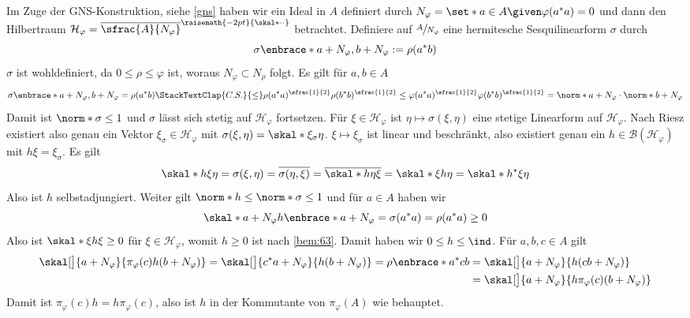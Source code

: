 \begin{beweis}
	Im Zuge der GNS-Konstruktion, siehe \autoref{gns} haben wir ein Ideal in $A$ definiert durch $N_\varphi = \set*{a \in A \given \varphi(a^*a)=0}$ und dann den Hilbertraum $\mathcal{H}_\varphi = \overline{\sfrac{A}{N_\varphi}}^{\raisemath{-2pt}{\skal*{\cdot}{\cdot}}}$ betrachtet.
	Definiere auf $\sfrac{A}{N_\varphi}$ eine hermitesche Sesquilinearform $\sigma$ durch 
	\[
		\sigma \enbrace*{a + N_\varphi, b+ N_\varphi} := \rho(a^* b)
	\]
	$\sigma$ ist wohldefiniert, da $0 \le \rho \le \varphi$ ist, woraus $N_\varphi \subset N_\rho$ folgt.
	Es gilt für $a,b \in A$
	\[
		\sigma \enbrace*{a+ N_\varphi, b+N_\varphi} = \rho(a^*b) \StackTextClap{C.S.}{\le} \rho(a^*a)^{\sfrac{1}{2}} \rho(b^*b)^{\sfrac{1}{2}} \le \varphi(a^*a)^{\sfrac{1}{2}} \varphi(b^*b)^{\sfrac{1}{2}} 
		= \norm*{a + N_\varphi} \cdot \norm*{b+ N_\varphi}
	\]
	Damit ist $\norm*{\sigma}\le 1$ und $\sigma$ lässt sich stetig auf $\mathcal{H}_\varphi$ fortsetzen.
	Für $\xi \in \mathcal{H}_\varphi$ ist $\eta \mapsto \sigma(\xi,\eta)$ eine stetige Linearform auf $\mathcal{H}_\varphi$.
	Nach Riesz existiert also genau ein Vektor $\xi_\sigma \in \mathcal{H}_\varphi$ mit $\sigma(\xi,\eta) = \skal*{\xi_\sigma}{\eta}$.
	$\xi \mapsto \xi_\sigma$ ist linear und beschränkt, also existiert genau ein $h \in \mathcal{B}(\mathcal{H}_\varphi)$ mit $h \xi= \xi_\sigma$.
	Es gilt
	\[
		\skal*{h \xi}{\eta} = \sigma(\xi,\eta) = \overline{\sigma(\eta,\xi)} = \overline{\skal*{h \eta}{\xi}} = \skal*{\xi}{h \eta} = \skal*{h^* \xi}{\eta}
	\]
	Also ist $h$ selbstadjungiert.
	Weiter gilt $\norm*{h} \le \norm*{\sigma} \le 1$ und für $a \in A$ haben wir
	\[
		\skal*{a + N_\varphi}{h \enbrace*{a+ N_\varphi}}= \sigma(a^*a)=\rho(a^*a)\ge 0
	\]
	Also ist $\skal*{\xi}{h \xi} \ge 0$ für $\xi \in \mathcal{H}_\varphi$, womit $h \ge 0$ ist nach \autoref{bem:63}. 
	Damit haben wir $0 \le h \le \ind$.
	Für $a,b,c \in A$ gilt 
	\begin{align}
		\skal[\big]{a + N_\varphi}{\pi_\varphi(c)h (b+N_\varphi)} = \skal[\big]{c^*a + N_\varphi}{h(b+N_\varphi)} = \rho \enbrace*{a^*cb} &= \skal[\big]{a + N_\varphi}{h(cb+N_\varphi)} \\
		&= \skal[\big]{a+ N_\varphi}{h \pi_\varphi(c)(b+ N_\varphi)}
	\end{align}
	Damit ist $\pi_\varphi(c) h = h \pi_\varphi(c)$, also ist $h$ in der Kommutante von $\pi_\varphi(A)$ wie behauptet.

\end{beweis}
